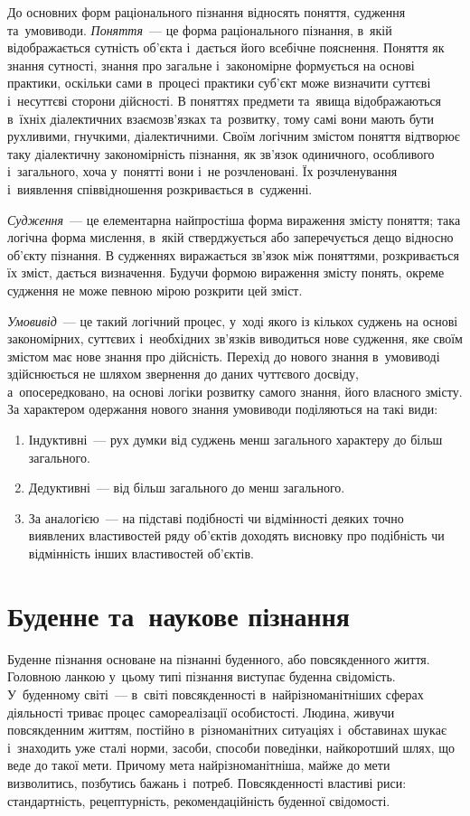 \documentclass[a5paper,oneside,DIV=12,12pt,headings=small]{scrartcl}
\begin{document}
		До основних форм раціонального пізнання відносять поняття, судження та~умовиводи. \emph{Поняття}~— це форма раціонального пізнання, в~якій відображається сутність об'\-єк\-та і~дається його всебічне пояснення. Поняття як знання сутності, знання про загальне і~закономірне формується на основі практики, оскільки сами в~процесі практики суб'\-єкт може визначити суттєві і~несуттєві сторони дійсності. В поняттях предмети та~явища відображаються в~їхніх діалектичних взаємозв'язках та~розвитку, тому самі вони мають бути рухливими, гнучкими, діалектичними. Своїм логічним змістом поняття відтворює таку діалектичну закономірність пізнання, як зв'язок одиничного, особливого і~загального, хоча у~понятті вони і~не розчленовані. Їх розчленування і~виявлення співвідношення розкривається в~судженні.

		\emph{Судження}~— це елементарна найпростіша форма вираження змісту поняття; така логічна форма мислення, в~якій стверджується або заперечується дещо відносно об'\-єк\-ту пізнання. В судженнях виражається зв'я\-зок між поняттями, розкривається їх зміст, дається визначення. Будучи формою вираження змісту понять, окреме судження не може певною мірою розкрити цей зміст.

		\emph{Умовивід}~— це такий логічний процес, у~ході якого із кількох суджень на основі закономірних, суттєвих і~необхідних зв'яз\-ків виводиться нове судження, яке своїм змістом має нове знання про дійсність. Перехід до нового знання в~умовиводі здійснюється не шляхом звернення до даних чуттєвого досвіду, а~опосередковано, на основі логіки розвитку самого знання, його власного змісту. За характером одержання нового знання умовиводи поділяються на такі види:
		\begin{enumerate}
			\item Індуктивні~— рух думки від суджень менш загального характеру до більш загального.
			\item Дедуктивні~— від більш загального до менш загального.
			\item За аналогією~— на підставі подібності чи відмінності деяких точно виявлених властивостей ряду об'\-єк\-тів доходять висновку про подібність чи відмінність інших властивостей об'\-єк\-тів.
		\end{enumerate}
		
	\section{Буденне та~наукове пізнання}
		Буденне пізнання основане на пізнанні буденного, або повсякденного життя. Головною ланкою у~цьому типі пізнання виступає буденна свідомість. У~буденному світі~— в~світі повсякденності в~найрізноманітніших сферах діяльності триває процес самореалізації особистості. Людина, живучи повсякденним життям, постійно в~різноманітних ситуаціях і~обставинах шукає і~знаходить уже сталі норми, засоби, способи поведінки, найкоротший шлях, що веде до такої мети. Причому мета найрізноманітніша, майже до мети визволитись, позбутись бажань і~потреб. Повсякденності властиві риси: стандартність, рецептурність, рекомендаційність буденної свідомості.
\end{document}

